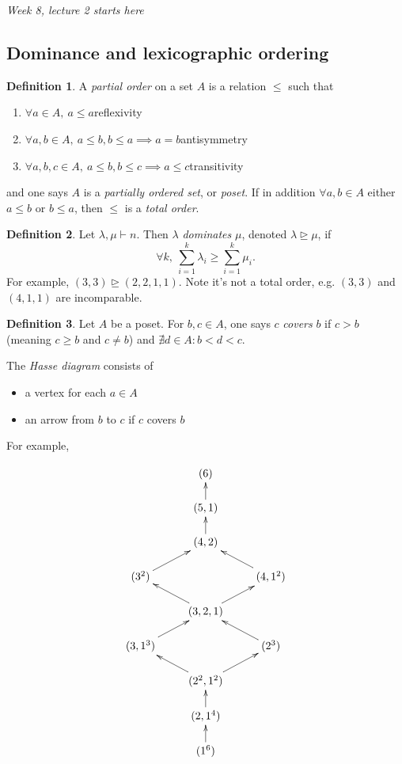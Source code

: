 \documentclass{article}
\theoremstyle{definition}
\newtheorem{defn}{Definition}[subsection]
\begin{document}
\begin{flushright}
\textit{Week 8, lecture 2 starts here}
\end{flushright}

\subsection{Dominance and lexicographic ordering}
\begin{defn}
A \textit{partial order} on a set $A$ is a relation $\leq$ such that
\begin{enumerate}
\item $\forall a\in A,\ a\leq a$\hfill reflexivity
\item $\forall a,b\in A,\ a\leq b,b\leq a\implies a=b$\hfill antisymmetry
\item $\forall a,b,c\in A,\ a\leq b,b\leq c\implies a\leq c$\hfill transitivity
\end{enumerate}
and one says $A$ is a \textit{partially ordered set}, or \textit{poset}. If in addition $\forall a,b\in A$ either $a\leq b$ or $b\leq a$, then $\leq$ is a \textit{total order}.
\end{defn}

\begin{defn}
Let $\lambda,\mu\vdash n$. Then $\lambda$ \textit{dominates} $\mu$, denoted $\lambda\unrhd \mu$, if
\[
\forall k,\ \sum_{i=1}^k \lambda_i\geq \sum_{i=1}^k \mu_i.
\]
For example, $(3,3)\unrhd (2,2,1,1)$. Note it's not a total order, e.g. $(3,3)$ and $(4,1,1)$ are incomparable.
\end{defn}

\begin{defn}
Let $A$ be a poset. For $b,c\in A$, one says $c$ \textit{covers} $b$ if $c>b$ (meaning $c\geq b$ and $c\neq b$) and $\nexists d\in A:b<d<c$.

The \textit{Hasse diagram} consists of
\begin{itemize}
\item a vertex for each $a\in A$
\item an arrow from $b$ to $c$ if $c$ covers $b$
\end{itemize}
For example,

\[
\xymatrix@R=1.5em{
  &(6)\\
  &(5,1)\ar[u]\\
  &(4,2)\ar[u]\\
  (3^2)\ar[ur] & & (4,1^2)\ar[ul]\\
  &(3,2,1)\ar[ur]\ar[ul]\\
  (3,1^3)\ar[ur] & & (2^3)\ar[ul]\\
  &(2^2,1^2)\ar[ul]\ar[ur]\\
  &(2,1^4)\ar[u]\\
  &(1^6)\ar[u]
}
\]
\end{defn}
\end{document}
